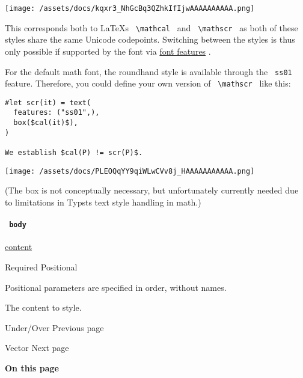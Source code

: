 \texttt{[image: /assets/docs/kqxr3\_NhGcBq3QZhkIfIjwAAAAAAAAAA.png]}

This corresponds both to LaTeX\textquotesingle s
\texttt{\ \textbackslash{}mathcal\ } and
\texttt{\ \textbackslash{}mathscr\ } as both of these styles share the
same Unicode codepoints. Switching between the styles is thus only
possible if supported by the font via
\href{/docs/reference/text/text/\#parameters-features}{font features} .

For the default math font, the roundhand style is available through the
\texttt{\ ss01\ } feature. Therefore, you could define your own version
of \texttt{\ \textbackslash{}mathscr\ } like this:

\begin{verbatim}
#let scr(it) = text(
  features: ("ss01",),
  box($cal(it)$),
)

We establish $cal(P) != scr(P)$.
\end{verbatim}

\texttt{[image: /assets/docs/PLEOQqYY9qiWLwCVv8j\_HAAAAAAAAAAA.png]}

(The box is not conceptually necessary, but unfortunately currently
needed due to limitations in Typst\textquotesingle s text style handling
in math.)

\paragraph{\texorpdfstring{\texttt{\ body\ }}{ body }}\label{functions-cal-body}

\href{/docs/reference/foundations/content/}{content}

{Required} {{ Positional }}

\label{functions-cal-body-positional-tooltip}
Positional parameters are specified in order, without names.

The content to style.

\href{/docs/reference/math/underover/}{\pandocbounded{}}

{ Under/Over } { Previous page }

\href{/docs/reference/math/vec/}{\pandocbounded{}}

{ Vector } { Next page }

\textbf{On this page}

